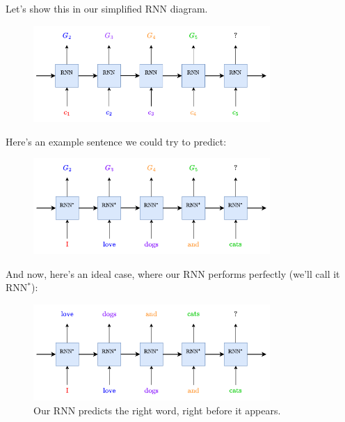         Let's show this in our simplified RNN diagram.

        \begin{figure}[H]
            \centering
            \includegraphics[width=90mm]{images/rnn_images/rnn_predict_text.png}
        \end{figure}

        Here's an example sentence we could try to predict:

        \begin{figure}[H]
            \centering
            \includegraphics[width=90mm]{images/rnn_images/rnn_predict_example.png}
        \end{figure}

        And now, here's an ideal case, where our RNN performs perfectly (we'll call it RNN$^*$):

        \begin{figure}[H]
            \centering
            \includegraphics[width=90mm]{images/rnn_images/rnn_predict_soln.png}
            \caption*{Our RNN predicts the right word, right before it appears.}
        \end{figure}

        

    \phantom{}

